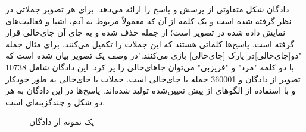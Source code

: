 	دادگان 
	\cite{yu2015visual}
	شکل متفاوتی از پرسش و پاسخ را ارائه می‌دهد. برای هر تصویر جملاتی در نظر گرفته شده ‌است و یک کلمه از آن که معمولاً مربوط به آدم، اشیا و  فعالیت‌های نمایش‌ داده‌ شده در تصویر است؛ از جمله حذف‌ شده و به جای آن جای‌خالی قرار ‌گرفته‌ است. پاسخ‌ها کلماتی هستند که این جملات را تکمیل می‌کنند. برای مثال جمله "دو[جای‌خالی]در پارک [جای‌خالی] بازی‌ می‌کنند."در وصف یک تصویر بیان‌ شده ‌است که با دو کلمه "مرد" و "فریزبی" می‌توان جاهای‌خالی‌ را پر کرد. این ‌دادگان شامل 10738 تصویر از ‌دادگان 
	\cite{lin2014microsoft}
	 و 360001 جمله با جای‌خالی است. جملات با جای‌خالی به طور خودکار و با استفاده از الگوهای از پیش ‌تعیین‌شده تولید شده‌اند. پاسخ‌ها در این ‌دادگان به هر دو شکل 
	و چند‌گزینه‌ای است.
  \begin{figure}
	\caption[یک نمونه از ‌دادگان ]{یک نمونه از ‌دادگان  \cite{yu2015visual}}
	\label{fig:visualmadlibsExample}
  \end{figure}

